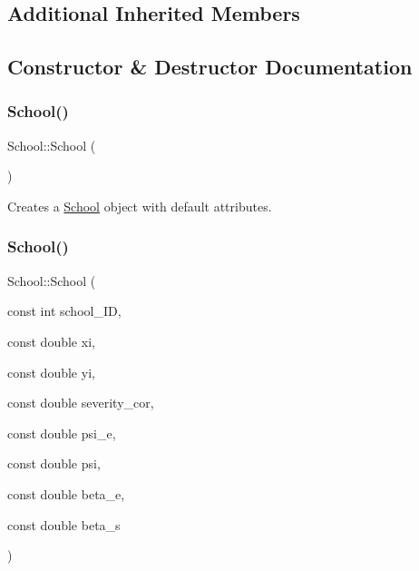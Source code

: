 \subsection*{Additional Inherited Members}


\subsection{Constructor \& Destructor Documentation}
\mbox{\label{classSchool_a18efa7137fe6c142ababf7d4ed838a07}} 
\subsubsection{\texorpdfstring{School()}{School()}\hspace{0.1cm}{\footnotesize\ttfamily [1/2]}}
{\footnotesize\ttfamily School\+::\+School (\begin{DoxyParamCaption}{ }\end{DoxyParamCaption})\hspace{0.3cm}{\ttfamily [default]}}



Creates a \hyperlink{classSchool}{School} object with default attributes. 

\mbox{\label{classSchool_a4f9cd6dacc298715885c917b8a14e4ca}} 
\subsubsection{\texorpdfstring{School()}{School()}\hspace{0.1cm}{\footnotesize\ttfamily [2/2]}}
{\footnotesize\ttfamily School\+::\+School (\begin{DoxyParamCaption}\item[{const int}]{school\+\_\+\+ID,  }\item[{const double}]{xi,  }\item[{const double}]{yi,  }\item[{const double}]{severity\+\_\+cor,  }\item[{const double}]{psi\+\_\+e,  }\item[{const double}]{psi,  }\item[{const double}]{beta\+\_\+e,  }\item[{const double}]{beta\+\_\+s }\end{DoxyParamCaption})\hspace{0.3cm}{\ttfamily [inline]}}



